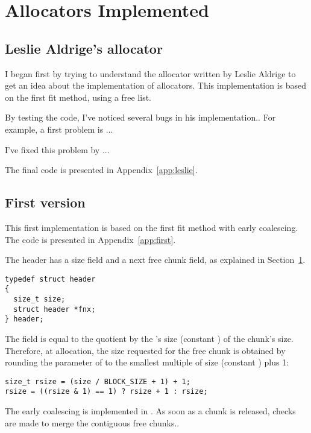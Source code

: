 

\section{Allocators Implemented}
\label{sec:impl}

\subsection{Leslie Aldrige's allocator}
I began first by trying to understand the allocator written by Leslie Aldrige  \cite{Aldridge08} to get an idea about the implementation of allocators. This implementation is based on the first fit method, using a free list.

By testing the code, I've noticed several bugs in his implementation..
For example, a first problem is ...

I've fixed this problem by ...

The final code is presented in Appendix~\ref{app:leslie}.


\subsection{First version}
This first implementation is based on the first fit method with early coalescing. 
The code is presented in Appendix~\ref{app:first}.

The header has a size field and a next free chunk field, as explained in Section~\ref{sec:impl}.
\begin{lstlisting}[style=cstyle]
typedef struct header
{
  size_t size;			
  struct header *fnx;
} header;
\end{lstlisting}

The field  is equal to the quotient by the 's size (constant ) of the chunk's size.
Therefore, at allocation, the size requested for the free chunk is obtained by rounding the parameter  of  to the smallest multiple of  size (constant ) plus 1:
\begin{lstlisting}[style=cstyle]
size_t rsize = (size / BLOCK_SIZE + 1) + 1; 
rsize = ((rsize & 1) == 1) ? rsize + 1 : rsize;
\end{lstlisting}

The early coalescing is implemented in .
As soon as a chunk is released, checks are made to merge the contiguous free chunks..

